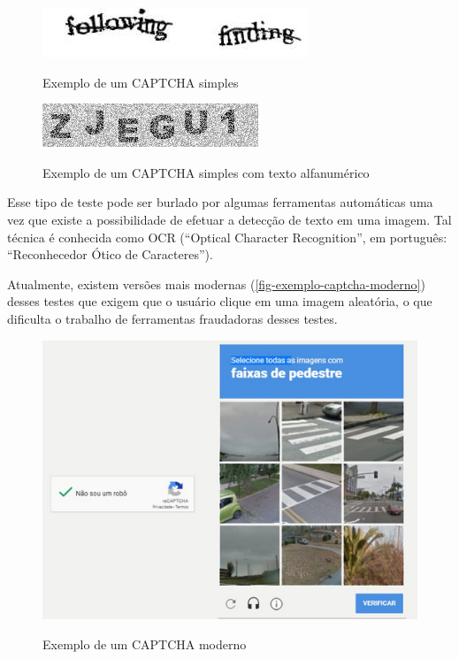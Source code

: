 \begin{figure}[h]
    \centering
    \caption{Exemplo de um CAPTCHA simples}
    \includegraphics[scale=0.5]{tcc/figures/captcha/captcha-frase.jpg}
    \label{fig-exemplo-captcha-simples}
\end{figure}

\begin{figure}[h]
    \centering
    \caption{Exemplo de um CAPTCHA simples com texto alfanumérico}
    \includegraphics[scale=0.5]{tcc/figures/captcha/captcha-alfanumerico.png}
    \label{fig-exemplo-captcha-alfanumerico}
\end{figure}

Esse tipo de teste pode ser burlado por algumas ferramentas automáticas uma vez que existe a possibilidade de efetuar a detecção de texto em uma imagem. Tal técnica é conhecida como OCR (``Optical Character Recognition'', em português: ``Reconhecedor Ótico de Caracteres'').\cite{captchaExame}

Atualmente, existem versões mais modernas (\autoref{fig-exemplo-captcha-moderno}) desses testes que exigem que o usuário clique em uma imagem aleatória, o que dificulta o trabalho de ferramentas fraudadoras desses testes.\cite{captchaExame}

\begin{figure}[h]
    \centering
    \caption{Exemplo de um CAPTCHA moderno}
    \includegraphics[scale=0.15]{tcc/figures/captcha/recaptcha-post-g1.jpg}
    \label{fig-exemplo-captcha-moderno}
\end{figure}

